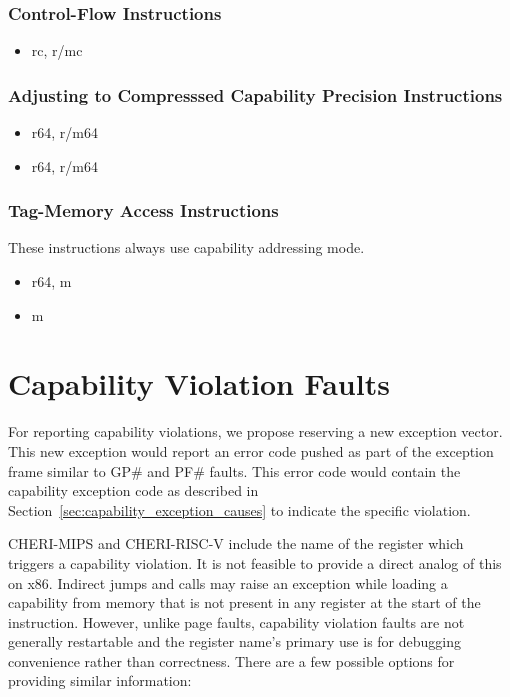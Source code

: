 \subsubsection{Control-Flow Instructions}

\begin{itemize}
  \item {} rc, r/mc
\end{itemize}

\subsubsection{Adjusting to Compresssed Capability Precision
  Instructions}

\begin{itemize}
  \item {} r64, r/m64
  \item {} r64, r/m64
\end{itemize}

\subsubsection{Tag-Memory Access Instructions}

These instructions always use capability addressing mode.

\begin{itemize}
  \item {} r64, m
  \item {} m
\end{itemize}

\section{Capability Violation Faults}
\label{sec:x86:capability-fault}

For reporting capability violations, we propose reserving a new
exception vector.  This new exception would report an error code
pushed as part of the exception frame similar to GP\# and PF\# faults.
This error code would contain the capability exception code as
described in Section~\ref{sec:capability_exception_causes} to indicate
the specific violation.

CHERI-MIPS and CHERI-RISC-V include the name of the register which
triggers a capability violation.  It is not feasible to provide a
direct analog of this on x86.  Indirect jumps and calls may raise an
exception while loading a capability from memory that is not present
in any register at the start of the instruction.  However, unlike page
faults, capability violation faults are not generally restartable and
the register name's primary use is for debugging convenience rather than
correctness.  There are a few possible options for providing similar
information:

